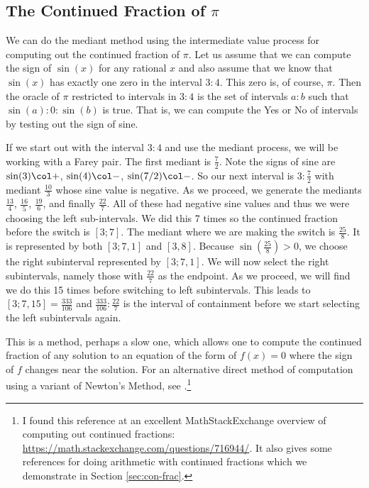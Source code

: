 \documentclass[12pt]{article}
\begin{document}
\subsection{The Continued Fraction of \texorpdfstring{$\pi$}{pi}}

We can do the mediant method using the intermediate value process for computing out the continued fraction of $\pi$. Let us assume that we can compute the sign of $\sin(x)$ for any rational $x$ and also assume that we know that $\sin(x)$ has exactly one zero in the interval $3:4$. This zero is, of course, $\pi$. Then the oracle of $\pi$ restricted to intervals in $3:4$ is the set of intervals $a:b$ such that $\sin(a):0:\sin(b)$ is true. That is, we can compute the Yes or No of intervals by testing out the sign of sine. 

If we start out with the interval  $3:4$ and use the mediant process, we will be working with a Farey pair. The first mediant is $\frac{7}{2}$. Note the signs of sine are  $\sin(3) \col +$, $\sin(4) \col -$, $\sin(7/2) \col -$. So our next interval is $3:\frac{7}{2}$ with mediant $\frac{10}{3}$ whose sine value is negative. As we proceed, we generate the mediants $\frac{13}{4}$, $\frac{16}{5}$, $\frac{19}{6}$, and finally $\frac{22}{7}$. All of these had negative sine values and thus we were choosing the left sub-intervals. We did this 7 times so the continued fraction before the switch is $[3;7]$. The mediant where we are making the switch is $\frac{25}{8}$. It is represented by both $[3; 7, 1]$ and $[3, 8]$.  Because $\sin(\frac{25}{8}) > 0$, we choose the right subinterval represented by $[3; 7, 1]$. We will now select the right subintervals, namely those with $\frac{22}{7}$ as the endpoint. As we proceed, we will find we do this 15 times before switching to left subintervals. This leads to $[3; 7, 15] = \frac{333}{106}$ and $\frac{333}{106}:\frac{22}{7}$ is the interval of containment before we start selecting the left subintervals again.

This is a method, perhaps a slow one, which allows one to compute the continued fraction of any solution to an equation of the form of $f(x) =0$ where the sign of $f$ changes near the solution. For an alternative direct method of computation using a variant of Newton's Method, see \cite{shiu95}.\footnote{I found this reference at an excellent MathStackExchange overview of computing out continued fractions: \url{https://math.stackexchange.com/questions/716944/}.  It also gives some references for doing arithmetic with continued fractions which we demonstrate in Section \ref{sec:con-frac}.} 
\end{document}
